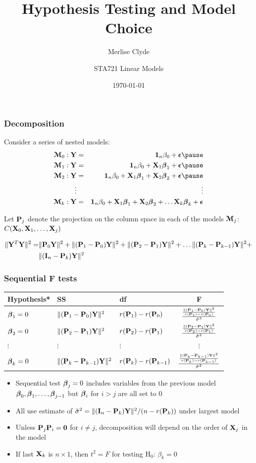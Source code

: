 \documentclass[handout]{beamer}
\title{Hypothesis Testing and Model Choice}
\subtitle{Merlise Clyde}
\author{STA721 Linear Models}
\institute{Duke University}
\date{\today}
\begin{document}
\maketitle



\begin{frame}
  \frametitle{Decomposition}
  Consider a series of nested models: \pause
  \begin{eqnarray*}
    \M_0: \Y & = & \one_n \beta_0 + \eps   \pause\\
\M_1: \Y & = & \one_n \beta_0 + \X_1 \b_1 + \eps  \pause \\
\M_2: \Y & = & \one_n \beta_0 + \X_1 \b_1 + \X_2 \b_2 + \eps   \pause\\
\vdots & & \vdots \\
\M_k: \Y & = & \one_n \beta_0 + \X_1 \b_1 + \X_2 \b_2 + \ldots \X_k \b_k + \eps 
  \end{eqnarray*} \pause

Let $\P_j$ denote the projection on the column space in each of the
models $\M_j$: $C(\X_0, \X_1, \ldots, \X_j)$ \pause
\begin{small}
  \begin{align*}
\| \Y^T\Y \|^2 =&  \| \P_0 \Y\|^2 + \| (\P_1 - \P_0) \Y \|^2 + \|(\P_2
- \P_1)\Y\|^2 + \ldots \| (\P_k - \P_{k-1})\Y \|^2 + \\ 
& \|(\I_n -
\P_k)\Y\|^2
 \end{align*}
\end{small}

\end{frame}
\begin{frame}
  \frametitle{Sequential F tests}

  \begin{tabular}{lllc} \hline
    Hypothesis* & SS & df & F \\ \hline
$\b_1 = 0$ & $\| (\P_1 - \P_0) \Y \|^2$ & $r(\P_1) - r(\P_0)$ & $
\frac{\frac{\| (\P_1 - \P_0) \Y \|^2} {r(\P_1) - r(\P_0) }}{\shat}$
\pause \\
$\b_2 = 0$ & $\| (\P_2 - \P_1) \Y \|^2$ & $r(\P_2) - r(\P_1)$ & $ \frac{\frac{\| (\P_
2 - \P_1) \Y \|^2} {r(\P_2) - r(\P_1) }}{\shat}$  \pause \\
$\vdots$ &$\vdots$ & $\vdots$& $\vdots$ \\
 $\b_k = 0$ & $\| (\P_k - \P_{k-1}) \Y \|^2$ & $r(\P_k) - r(\P_{k-1})$ & $ \frac{\frac{\| (\P_
k - \P_{k-1}) \Y \|^2} {r(\P_k) - r(\P_{k-1}) }}{\shat}$  \pause
  \end{tabular}
  \begin{itemize}
  \item Sequential test $\b_j = 0$ includes variables from the
    previous model $\b_0, \b_1,\ldots, \b_{j-1}$ but $\b_i$ for $i >
    j$ are all set to $0$  \pause
  \item All use estimate of $\shat =  \|(\I_n -
    \P_k)\Y\|^2 /(n - r(\P_k))$ under largest model
 \pause
  \item Unless $\P_j\P_i = \zero$ for $i \neq j$, decomposition will
    depend on the order of $\X_j$ in the model  \pause
  \item If last $\X_k$ is $n\times 1$, then $t^2 = F$  for testing H$_0$:
    $\beta_k = 0$  \pause
  \end{itemize}
\end{frame}
\end{document}
